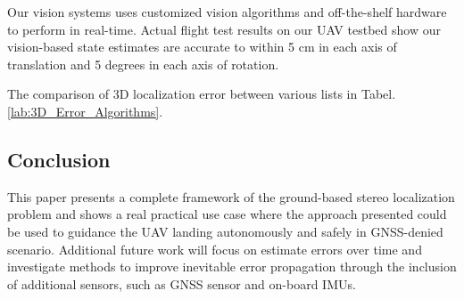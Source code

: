 Our vision systems uses customized vision algorithms and off-the-shelf hardware to perform in real-time. Actual flight test results on our UAV testbed show our vision-based state estimates are accurate to within 5 cm in each axis of translation and 5 degrees in each axis of rotation.

The comparison of 3D localization error between various lists in Tabel. \ref{lab:3D_Error_Algorithms}.

\subsection{Conclusion}
This paper presents a complete framework of the ground-based stereo localization  problem and shows a real practical use case where the approach
presented could be used to guidance the UAV landing autonomously and safely in GNSS-denied scenario. Additional future work will focus on estimate errors over time and investigate methods to improve inevitable error propagation through the inclusion of additional sensors, such as GNSS sensor and on-board IMUs.







%
%

